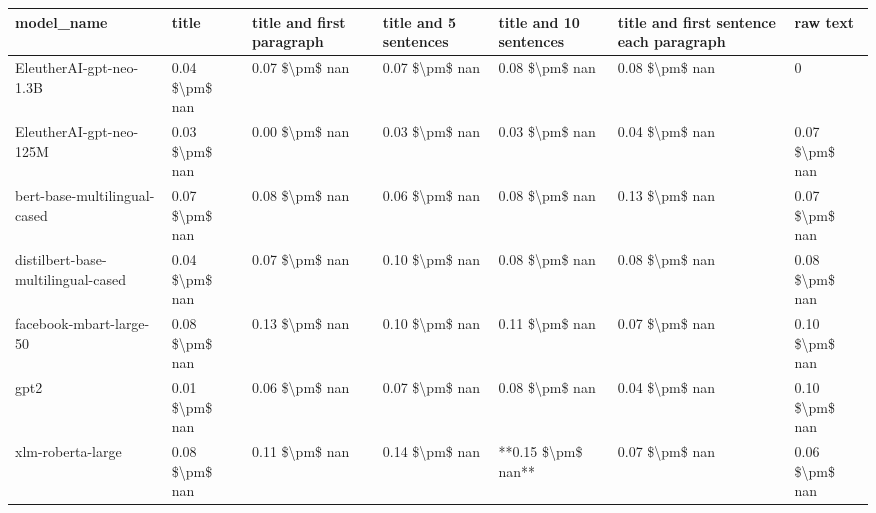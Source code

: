 \begin{tabular}{lllllll}
\toprule
                        model\_name &          title & title and first paragraph & title and 5 sentences & title and 10 sentences & title and first sentence each paragraph &       raw text \\
\midrule
           EleutherAI-gpt-neo-1.3B & 0.04 \$\textbackslash pm\$ nan &            0.07 \$\textbackslash pm\$ nan &        0.07 \$\textbackslash pm\$ nan &         0.08 \$\textbackslash pm\$ nan &                          0.08 \$\textbackslash pm\$ nan &              0 \\
           EleutherAI-gpt-neo-125M & 0.03 \$\textbackslash pm\$ nan &            0.00 \$\textbackslash pm\$ nan &        0.03 \$\textbackslash pm\$ nan &         0.03 \$\textbackslash pm\$ nan &                          0.04 \$\textbackslash pm\$ nan & 0.07 \$\textbackslash pm\$ nan \\
      bert-base-multilingual-cased & 0.07 \$\textbackslash pm\$ nan &            0.08 \$\textbackslash pm\$ nan &        0.06 \$\textbackslash pm\$ nan &         0.08 \$\textbackslash pm\$ nan &                          0.13 \$\textbackslash pm\$ nan & 0.07 \$\textbackslash pm\$ nan \\
distilbert-base-multilingual-cased & 0.04 \$\textbackslash pm\$ nan &            0.07 \$\textbackslash pm\$ nan &        0.10 \$\textbackslash pm\$ nan &         0.08 \$\textbackslash pm\$ nan &                          0.08 \$\textbackslash pm\$ nan & 0.08 \$\textbackslash pm\$ nan \\
           facebook-mbart-large-50 & 0.08 \$\textbackslash pm\$ nan &            0.13 \$\textbackslash pm\$ nan &        0.10 \$\textbackslash pm\$ nan &         0.11 \$\textbackslash pm\$ nan &                          0.07 \$\textbackslash pm\$ nan & 0.10 \$\textbackslash pm\$ nan \\
                              gpt2 & 0.01 \$\textbackslash pm\$ nan &            0.06 \$\textbackslash pm\$ nan &        0.07 \$\textbackslash pm\$ nan &         0.08 \$\textbackslash pm\$ nan &                          0.04 \$\textbackslash pm\$ nan & 0.10 \$\textbackslash pm\$ nan \\
                 xlm-roberta-large & 0.08 \$\textbackslash pm\$ nan &            0.11 \$\textbackslash pm\$ nan &        0.14 \$\textbackslash pm\$ nan &     **0.15 \$\textbackslash pm\$ nan** &                          0.07 \$\textbackslash pm\$ nan & 0.06 \$\textbackslash pm\$ nan \\
\bottomrule
\end{tabular}
